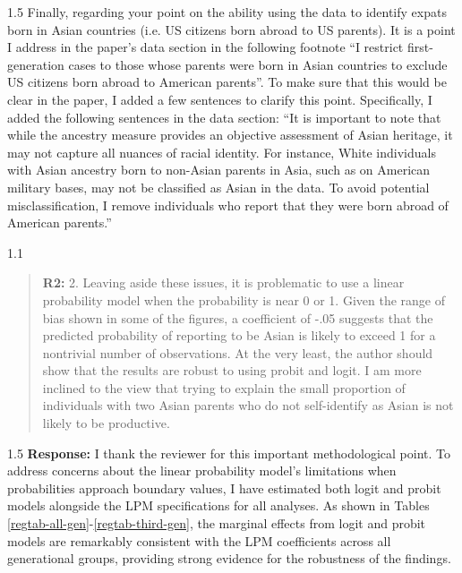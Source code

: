 \documentclass[12pt,english]{article}
\newcommand{\rrquote}{1.1}
\newcommand{\rrxspc}{1.5}
\begin{document}
\begin{refsection}
\begin{spacing}{\rrxspc}
            Finally, regarding your point on the ability using the data to identify expats born in Asian countries (i.e. US citizens born abroad to US parents). It is a point I address in the paper's data section in the following footnote ``I restrict first-generation cases to those whose parents were born in Asian countries to exclude US citizens born abroad to American parents''. To make sure that this would be clear in the paper, I added a few sentences to clarify this point. Specifically, I added the following sentences in the data section: ``It is important to note that while the ancestry measure provides an objective assessment of Asian heritage, it may not capture all nuances of racial identity. For instance, White individuals with Asian ancestry born to non-Asian parents in Asia, such as on American military bases, may not be classified as Asian in the data. To avoid potential misclassification, I remove individuals who report that they were born abroad of American parents.''

    \end{spacing}

    \begin{spacing}{\rrquote}
        \begin{quotation}
        \textbf{R2: } 2. Leaving aside these issues, it is problematic to use a linear probability model when the probability is near 0 or 1. Given the range of bias shown in some of the figures, a coefficient of -.05 suggests that the predicted probability of reporting to be Asian is likely to exceed 1 for a nontrivial number of observations. At the very least, the author should show that the results are robust to using probit and logit. I am more inclined to the view that trying to explain the small proportion of individuals with two Asian parents who do not self-identify as Asian is not likely to be productive.
        \end{quotation}
        \end{spacing}
        
        \begin{spacing}{\rrxspc}
            \textbf{Response:} I thank the reviewer for this important methodological point. To address concerns about the linear probability model's limitations when probabilities approach boundary values, I have estimated both logit and probit models alongside the LPM specifications for all analyses. As shown in Tables \ref{regtab-all-gen}-\ref{regtab-third-gen}, the marginal effects from logit and probit models are remarkably consistent with the LPM coefficients across all generational groups, providing strong evidence for the robustness of the findings.


\end{spacing}
\end{refsection}
\end{document}
